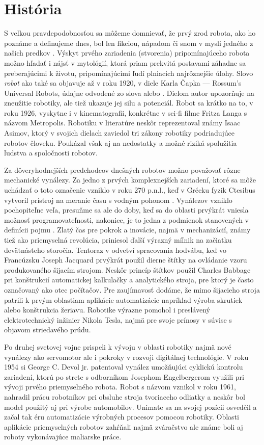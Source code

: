 \section{História}
S veľkou pravdepodobnosťou sa môžeme domnievať, že prvý zrod robota, ako ho poznáme a definujeme dnes, bol len fikciou, nápadom či snom v mysli jedného z našich predkov \cite{RoboticsAndAutomationHandbook}. Výskyt prvého zariadenia (stvorenia) pripomínajúceho robota možno hľadať i nájsť v mytológií, ktorá priam prekvitá postavami záhadne sa preberajúcimi k životu, pripomínajúcimi ľudí plniacich najrôznejšie úlohy. Slovo \textit{robot} ako také sa objavuje až v roku 1920, v diele Karla Čapka --- Rossum's Universal Robots, údajne odvodené zo slova  alebo . Dielom autor upozorňuje na zneužitie robotiky, ale tiež ukazuje jej silu a potenciál. Robot sa krátko na to, v roku 1926, vyskytne i v kinematografii, konkrétne v sci-fi filme Fritza Langa s názvom Metropolis. Robotiku v literatúre neskôr reprezentoval známy Isaac Asimov, ktorý v svojich dielach zaviedol tri zákony robotiky podriaďujúce robotov človeku. Poukázal však aj na nedostatky a možné riziká spolužitia ľudstva a spoločnosti robotov.

Za dôveryhodnejších predchodcov dnešných robotov možno považovať rôzne mechanické vynálezy. Za jedno z prvých komplexnejších zariadení, ktoré sa môže uchádzať o toto označenie vzniklo v roku 270 p.n.l., keď v Grécku fyzik Ctesibus vytvoril prístroj na meranie času s vodným pohonom \cite{RoboticsAndAutomationHandbook}. Vynálezov vzniklo pochopiteľne veľa, presuňme sa ale do doby, keď sa do oblasti prvýkrát vniesla možnosť programovateľnosti, nakoniec, je to jedna z podmienok stanovených v definícii pojmu  \cite{ISORobot}. Zlatý čas pre pokrok a inovácie, najmä v mechanizácií, známy tiež ako priemyselná revolúcia, priniesol ďalší výrazný míľnik na začiatku devätnásteho storočia. Tentoraz v odvetví spracovania hodvábu, keď vo Francúzsku Joseph Jacquard prvýkrát použil dierne štítky na ovládanie vzoru produkovaného šijacím strojom. Neskôr princíp štítkov použil Charles Babbage pri konštrukcií automatickej kalkulačky a analytického stroja, pre ktorý je často označovaný ako otec počítačov. Pre zaujímavosť dodáme, že mimo šijacieho stroja patrili k prvým oblastiam aplikácie automatizácie napríklad výroba skrutiek alebo konštrukcia žeriavu. Robotike výrazne pomohol i preslávený elektrotechnický inžinier Nikola Tesla, najmä pre svoje prínosy v súvise s objavom striedavého prúdu.

Po druhej svetovej vojne prispeli k vývoju v oblasti robotiky najmä nové vynálezy ako servomotor ale i pokroky v rozvoji digitálnej technológie. V roku 1954 si George C. Devol jr. patentoval vynález umožňujúci cyklickú kontrolu zariadení, ktorú po strete s odborníkom Josephom Engelbergerom využili pri vývoji prvého priemyselného robota. Robot s názvom  vznikol v roku 1961, nahradil prácu robotníkov pri obsluhe stroja tvoriaceho odliatky a neskôr bol model použitý aj pri výrobe automobilov. Unimate sa na svojej pozícii osvedčil a začal tak éru automatizácie výrobných procesov pomocou robotiky. Oblasti aplikácie priemyselných robotov zahŕňali najmä zváračstvo ale známe boli aj roboty vykonávajúce maliarske práce.

